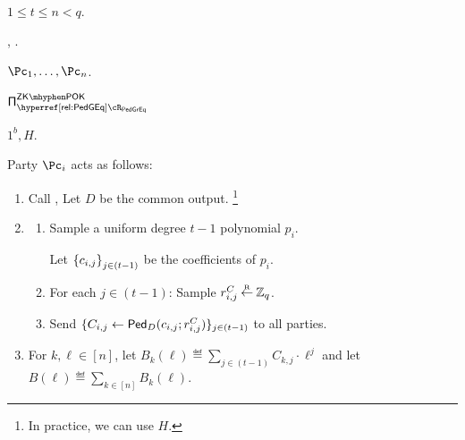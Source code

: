\begin{protocol}\label{prot:TshEG:KG}~
	
	
	\item[Paramters:] $1\le t\le n <q$.
	
	\item[Oracles:] \randomH, \Mult.
	
	
	\item[Parties:] $\Pc_1,\ldots,\Pc_n$.

	
	\item[Proofs:] $\piZKPOK{\rPedGEq}$
			
	\item[Common input:]	$1^b,H$.
	
	
	\item[Operation:] Party $\Pc_i$ acts as follows:
	
	
	\begin{enumerate}

       
        \item Call \randomH, Let $D$ be the common output. \footnote{In practice, we can use $H$.}
        
        
    	\item  	{}
    
   
		\begin{enumerate}  
			
			\item Sample  a uniform degree $t-1$ polynomial  $p_i$.   
			
			Let $\set{c_{i,j}}_{j\in (t-1)}$ be the coefficients of  $p_i$. 			
			
			
			
			\item For each $j\in (t-1)$: Sample   $r^C_{i,j} \mathbin{\stackrel{\mbox{\tiny R}}{\leftarrow}}\mathbb{Z}_q$. 
			
			\item Send   $\{C_{i,j} \leftarrow \mathsf{Ped}_D(c_{i,j};r^C_{i,j})\}_{j\in (t-1)}$  to all parties. 
			
			
			
			
			\end{enumerate}
			
			\item[$\bullet$]  For $k,\ell \in [n]$, let $B_k(\ell)  \eqdef   \sum_{j\in (t-1)} C_{k,j} \cdot \ell^j$ and let $B(\ell) 
			\eqdef \sum_{k \in [n]} B_k(\ell) $. 
			

\end{enumerate}
\end{protocol}
